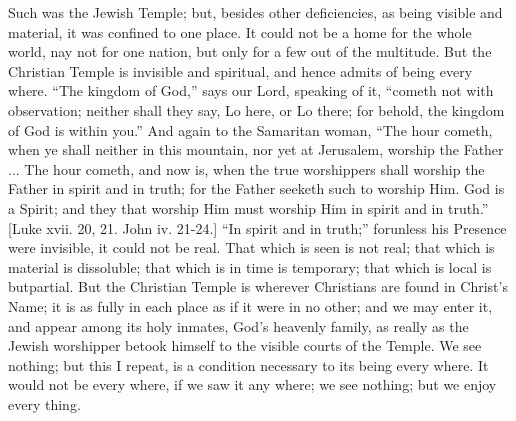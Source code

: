Such was the Jewish Temple; but, besides other deficiencies, as
being visible and material, it was confined to one place. It could not
be a home for the whole world, nay not for one nation, but only for a
few out of the multitude. But the Christian Temple is invisible and
spiritual, and hence admits of being every where. ``The kingdom of
God,'' says our Lord, speaking of it, ``cometh not with
observation; neither shall they say, Lo here, or Lo there; for behold,
the kingdom of God is within you.'' And again to the Samaritan
woman, ``The hour cometh, when ye shall neither in this mountain,
nor yet at Jerusalem, worship the Father ... The hour cometh, and now
is, when the true worshippers shall worship the Father in spirit and
in truth; for the Father seeketh such to worship Him. God is a Spirit;
and they that worship Him must worship Him in spirit and in
truth.'' [Luke xvii. 20, 21. John iv. 21-24.] ``In spirit and
in truth;'' for\emph{}unless his Presence were invisible, it
could not be real. That which is seen is not real; that which is
material is dissoluble; that which is in time is temporary; that which
is local is but\emph{}partial. But the Christian Temple is wherever
Christians are found in Christ's Name; it is as fully in each place as
if it were in no other; and we may enter it, and appear among its holy
inmates, God's heavenly family, as really as the Jewish worshipper
betook himself to the visible courts of the Temple. We see nothing;
but this I repeat, is a condition necessary to its being every where.
It would not be every where, if we saw it any where; we see nothing;
but we enjoy every thing.


